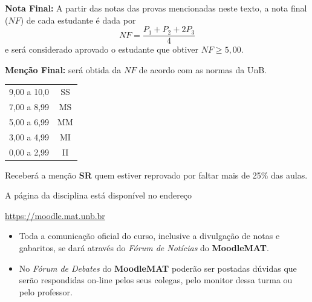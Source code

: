 \documentclass[12pt]{exam}
\begin{document}
    {\bf \noindent Nota Final:} A partir das notas das provas mencionadas neste texto, a nota final ($NF$) de cada estudante é dada
    por
    \vspace{-0.15cm}
    \[
        NF = \frac{ P_1 + P_2 + 2P_3}{4}
    \]
    e será considerado aprovado o estudante que obtiver $NF \geq 5,00$.

    {\bf \noindent Menção Final:} será obtida da $NF$ de
    acordo com as normas da UnB.
    \begin{center}
        \begin{tabular}{c|c}
            \hline\hline
            \hspace{1cm}{Nota}\hspace{1cm} & \hspace{0.25cm}{Menção}\hspace{0.25cm}\\
            \hline\hline
            9,00 a 10,0 & SS \\
            \hline
            7,00 a 8,99 & MS \\
            \hline
            5,00 a 6,99 & MM \\
            \hline
            3,00 a 4,99 & MI \\
            \hline
            0,00 a 2,99  & II \\
            \hline\hline
        \end{tabular}
    \end{center}
    Receberá a menção {\bf SR} quem estiver reprovado por faltar mais de 25\%
    das aulas.

    \vspace{0.5cm}
     A página da disciplina está disponível no endereço
    \begin{center}
        \href{https://moodle.mat.unb.br/course/view.php?id=65}{https://moodle.mat.unb.br}
    \end{center}


    \begin{itemize}
        \item Toda a comunicação oficial do curso, inclusive a divulgação de
        notas e gabaritos, se dará através do {\em Fórum de Notícias} do
        \textbf{MoodleMAT}.
        \item No {\em Fórum de Debates} do \textbf{MoodleMAT} poderão ser
        postadas dúvidas que serão respondidas on-line pelos seus
        colegas, pelo monitor dessa turma ou pelo professor.
    \end{itemize}
\end{document}
